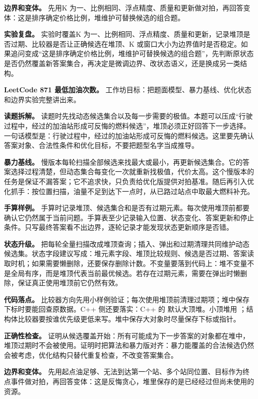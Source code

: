 \textbf{边界和变体。} 先用K 为一、比例相同、浮点精度、质量和更新做对拍，再回答变体：这是排序确定价格比例，堆维护可替换候选的组合题。

\textbf{实验复盘。} 实验时覆盖K 为一、比例相同、浮点精度、质量和更新，记录堆顶是否过期、比较器是否让正确候选在堆顶、K 或窗口大小为边界值时是否稳定。如果追问变成“这是排序确定价格比例，堆维护可替换候选的组合题”，先判断原状态是否仍然覆盖新答案集合，再决定是微调边界、改状态语义，还是换成另一类结构。

\noindent\textbf{LeetCode 871 最低加油次数。} 工作坊目标：把题面模型、暴力基线、优化状态和边界实验完整讲出来。

\textbf{读题拆解。} 读题时先找动态候选集合以及每一步需要的极值。本题可以压成“行驶过程中，经过的加油站形成可反悔的燃料候选”，堆顶必须正好回答下一步选择。一句话模型是：行驶过程中，经过的加油站形成可反悔的燃料候选。这里要先确认答案对象、合法性条件和优化目标，不要把题型名字当成推导。

\textbf{暴力基线。} 慢版本每轮扫描全部候选来找最大或最小，再更新候选集合。它的答案选择过程清楚，但动态集合每变化一次就重新找极值，代价太高。这个慢版本的任务是保证不漏答案；它不追求快，只负责给优化版提供对拍基准。随后再引入优化抓手：按位置扫描，油量不足到达下一点时，从已路过站点中取最大燃料补充。

\textbf{手算样例。} 手算时记录堆顶、候选集合和是否有过期元素。每次使用堆顶前都要确认它仍然属于当前问题。手算表至少记录输入位置、状态变化、答案更新和停止条件。只写最终答案看不出边界，逐轮记录才能发现状态更新顺序是否错。

\textbf{状态升级。} 把每轮全量扫描改成堆顶查询；插入、弹出和过期清理共同维护动态候选集。状态字段建议写成：堆元素字段、堆顶比较规则、候选是否过期、答案读取时机；如果需要懒删除，还要保存删除计数。不变量要落到代码上：堆不变量不是全局有序，而是堆顶代表当前最优候选。若存在过期元素，需要在弹出时懒删除，保证真正使用堆顶前它仍然有效。

\textbf{代码落点。} 比较器方向先用小样例验证；每次使用堆顶前清理过期项；堆中保存下标时要能回查原数据。C++ 侧还要落实：C++ 的  默认大顶堆。小顶堆用 ；结构体比较器要按谁优先级更低来写。堆中保存大对象时尽量保存下标或指针。

\textbf{正确性检查。} 证明从候选覆盖开始：所有可能成为下一步答案的对象都在堆中，堆顶过期时不会被使用。证明时把算法和暴力版对齐：暴力能覆盖的合法候选仍然会被考虑，优化结构只替代重复检查，不改变答案集合。

\textbf{边界和变体。} 先用起点油足够、无法到达第一个站、多个站同位置、目标作为终点事件做对拍，再回答变体：这是反悔贪心，堆里保存的是已经经过但尚未使用的资源。

